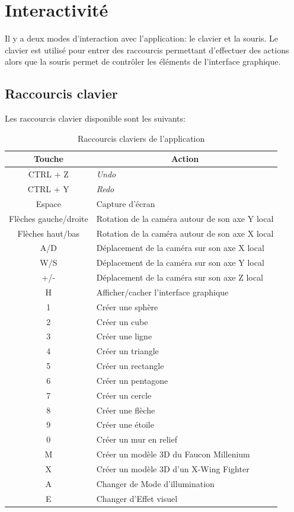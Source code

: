\section{Interactivité}
\label{s:interactivité}

Il y a deux modes d'interaction avec l'application: le clavier et la souris.
Le clavier est utilisé pour entrer des raccourcis permettant d'effectuer des actions alors que la souris permet de contrôler les éléments de l'interface graphique.

\subsection{Raccourcis clavier}
Les raccourcis clavier disponible sont les suivants:

\begin{table}[h]
    \begin{center}
    \begin{tabular}{|c|l|}
        \hline
        \multicolumn{1}{|c|}{Touche} & \multicolumn{1}{c|}{Action}\\
        \hline
        CTRL + Z & \emph{Undo}\\
        CTRL + Y & \emph{Redo}\\
        Espace & Capture d'écran\\  
        Flèches gauche/droite & Rotation de la caméra autour de son axe Y local\\
        Flèches haut/bas & Rotation de la caméra autour de son axe X local\\
        A/D & Déplacement de la caméra sur son axe X local\\
        W/S & Déplacement de la caméra sur son axe Y local\\
        +/- & Déplacement de la caméra sur son axe Z local\\
        H & Afficher/cacher l'interface graphique\\
        1 & Créer une sphère\\
        2 & Créer un cube\\
        3 & Créer une ligne\\
        4 & Créer un triangle\\
        5 & Créer un rectangle\\
        6 & Créer un pentagone\\
        7 & Créer un cercle\\
        8 & Créer une flèche\\
        9 & Créer une étoile\\
        0 & Créer un mur en relief\\
        M & Créer un modèle 3D du Faucon Millenium\\
        X & Créer un modèle 3D d'un X-Wing Fighter\\
        A & Changer de Mode d'illumination \\
        E & Changer d'Effet visuel \\
        \hline
    \end{tabular}
    \caption{Raccourcis claviers de l'application}
    \end{center}
\end{table}

